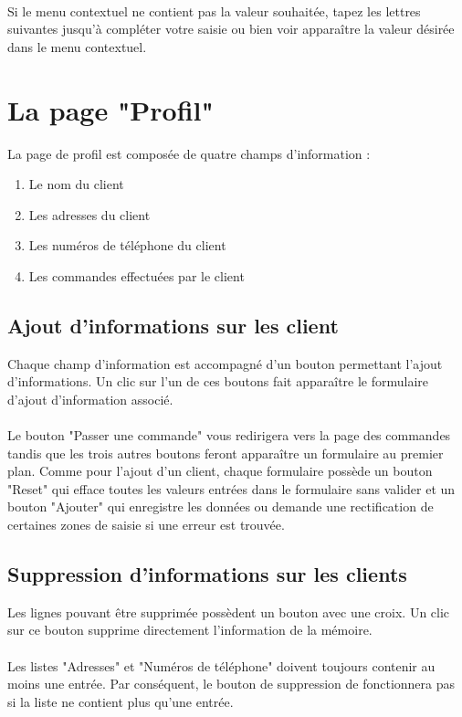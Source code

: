 \paragraph{}
Si le menu contextuel ne contient pas la valeur souhaitée, tapez les lettres
suivantes jusqu'à compléter votre saisie ou bien voir apparaître la valeur
désirée dans le menu contextuel.

\section{La page "Profil"}
La page de profil est composée de quatre champs d'information :

\begin{enumerate}
  \item Le nom du client
  \item Les adresses du client
  \item Les numéros de téléphone du client
  \item Les commandes effectuées par le client
\end{enumerate}

\subsection{Ajout d'informations sur les client}
Chaque champ d'information est accompagné d'un bouton permettant l'ajout d'informations.
Un clic sur l'un de ces boutons fait apparaître le formulaire d'ajout
d'information associé.

\paragraph{}
Le bouton "Passer une commande" vous redirigera vers la page des commandes
tandis que les trois autres boutons feront apparaître un formulaire au premier
plan. Comme pour l'ajout d'un client, chaque formulaire possède un bouton "Reset"
qui efface toutes les valeurs entrées dans le formulaire sans valider et un
bouton "Ajouter" qui enregistre les données ou demande une rectification de
certaines zones de saisie si une erreur est trouvée.

\subsection{Suppression d'informations sur les clients}
Les lignes pouvant être supprimée possèdent
un bouton avec une croix. Un clic sur ce bouton supprime directement
l'information de la mémoire.

\paragraph{}
Les listes "Adresses" et "Numéros de téléphone" doivent toujours contenir au
moins une entrée. Par conséquent, le bouton de suppression de fonctionnera pas
si la liste ne contient plus qu'une entrée.
